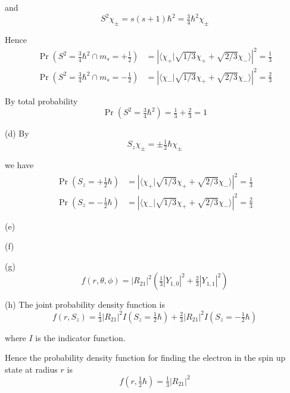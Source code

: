 and
\begin{equation*}
S^2\chi_\pm=s(s+1)\hbar^2=\tfrac{3}{4}\hbar^2\chi_\pm
\end{equation*}

Hence
\begin{align*}
\Pr\left(S^2=\tfrac{3}{4}\hbar^2\cap m_s=+\tfrac{1}{2}\right)
&=\left|\langle\chi_+|\sqrt{1/3}\chi_++\sqrt{2/3}\chi_-\rangle\right|^2=\tfrac{1}{3}
\\[1ex]
\Pr\left(S^2=\tfrac{3}{4}\hbar^2\cap m_s=-\tfrac{1}{2}\right)
&=\left|\langle\chi_-|\sqrt{1/3}\chi_++\sqrt{2/3}\chi_-\rangle\right|^2=\tfrac{2}{3}
\end{align*}

By total probability
\begin{equation*}
\Pr\left(S^2=\tfrac{3}{4}\hbar^2\right)=\tfrac{1}{3}+\tfrac{2}{3}=1
\end{equation*}

(d) By
\begin{equation*}
S_z\chi_\pm=\pm\tfrac{1}{2}\hbar\chi_\pm
\end{equation*}

we have
\begin{align*}
\Pr\left(S_z=+\tfrac{1}{2}\hbar\right)
&=\left|\langle\chi_+|\sqrt{1/3}\chi_++\sqrt{2/3}\chi_-\rangle\right|^2=\tfrac{1}{3}
\\[1ex]
\Pr\left(S_z=-\tfrac{1}{2}\hbar\right)
&=\left|\langle\chi_-|\sqrt{1/3}\chi_++\sqrt{2/3}\chi_-\rangle\right|^2=\tfrac{2}{3}
\end{align*}

(e)

\bigskip
(f)

\bigskip
(g)
\begin{equation*}
f(r,\theta,\phi)=|R_{21}|^2\left(\tfrac{1}{3}|Y_{1,0}|^2+\tfrac{2}{3}|Y_{1,1}|^2\right)
\end{equation*}

(h) The joint probability density function is
\begin{equation*}
f(r,S_z)=\tfrac{1}{3}|R_{21}|^2I\left(S_z=\tfrac{1}{2}\hbar\right)
+\tfrac{2}{3}|R_{21}|^2I\left(S_z=-\tfrac{1}{2}\hbar\right)
\end{equation*}

where $I$ is the indicator function.

\bigskip
Hence the probability density function for finding the electron in the
spin up state at radius $r$ is
\begin{equation*}
f\left(r,\tfrac{1}{2}\hbar\right)=\tfrac{1}{3}|R_{21}|^2
\end{equation*}


